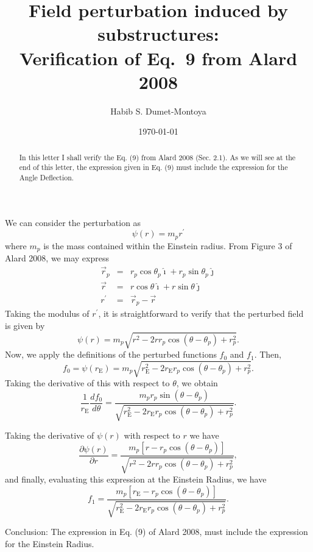 \documentclass[a4paper,twoside]{article}
\def \re {r_{\mathrm{E}}}
\def \te {\theta}
\def \tep {\theta_p}
\def \prtl {\partial}
\begin{document}
\title{Field perturbation induced by substructures: \\ Verification of Eq.~9 from Alard 2008}
%
\author{Habib S. Dumet-Montoya}
\begin{abstract}
In this letter I shall verify the Eq. (9) from Alard 2008 (Sec. 2.1). As we will
see at the end of this letter, the expression given in Eq. (9) must
include the expression for the Angle Deflection.
\end{abstract}

\date{\today}
\maketitle
We can consider the perturbation as
\begin{equation}
\psi(r)=m_p r^\prime
\end{equation}
where $m_p$ is the mass contained within the Einstein radius. From Figure 3 of Alard 2008, we may express
\begin{eqnarray}
\vec{r}_p&=&r_p\cos{\tep}\hat{\imath} + r_p\sin{\tep}\hat{\jmath}\\
\vec{r}&=&r\cos{\te}\hat{\imath} + r\sin{\te}\hat{\jmath}\\
r^\prime&=&\vec{r}_p-\vec{r}
\end{eqnarray}
Taking the modulus of $r^\prime$, it is straightforward to verify that
the perturbed field is given by
\begin{equation}
\psi(r)=m_p\sqrt{r^2-2r r_p\cos{(\te-\tep)}+r^2_p}.
\end{equation} 
Now, we apply the definitions of the perturbed functions $f_0$ and $f_1$. Then,
\begin{equation}
f_0=\psi(\re)=m_p \sqrt{\re^2-2\re r_p\cos{(\te-\tep)}+r^2_p}.
\end{equation}
Taking the derivative of this with respect to $\te$, we obtain
\begin{equation}
\frac{1}{\re}\frac{d f_0}{d\te}=\frac{m_p r_p \sin{(\te -\tep)}}{\sqrt{\re^2-2\re r_p\cos{(\te-\tep)}+r^2_p}}.
\end{equation}

Taking the derivative of $\psi(r)$ with respect to $r$ we have
\begin{equation*}
\frac{\prtl  \psi(r)}{\prtl r}=\frac{m_p[r-r_p\cos{(\te-\tep)}]}{\sqrt{r^2-2r r_p\cos{(\te-\tep)}+r^2_p}},
\end{equation*}
and finally, evaluating this expression at the Einstein Radius, we have
\begin{equation}
f_1=\frac{m_p[\re-r_p\cos{(\te-\tep)}]}{\sqrt{\re^2-2\re r_p\cos{(\te-\tep)}+r^2_p}}.
\end{equation}

Conclusion: The expression in Eq. (9) of Alard 2008, must include the expression for the Einstein Radius.
\end{document}
